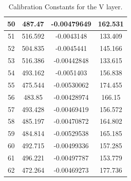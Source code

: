 \begin{table}[h]
{\begin{tabular}{|c|c|c|c|}
50   &   487.47   &   -0.00479649   &   162.531  \\  \hline  
51   &   516.592   &   -0.0043148   &   133.409  \\  \hline  
52   &   504.835   &   -0.0045441   &   145.166  \\  \hline  
53   &   516.386   &   -0.00442848   &   133.615  \\  \hline  
54   &   493.162   &   -0.0051403   &   156.838  \\  \hline  
55   &   475.544   &   -0.00530062   &   174.455  \\  \hline  
56   &   483.85   &   -0.00428974   &   166.15  \\  \hline  
57   &   493.428   &   -0.00469419   &   156.572  \\  \hline  
58   &   485.197   &   -0.00470872   &   164.802  \\  \hline  
59   &   484.814   &   -0.00529538   &   165.185  \\  \hline  
60   &   492.715   &   -0.00499336   &   157.285  \\  \hline  
61   &   496.221   &   -0.00497787   &   153.779  \\  \hline  
62   &   472.264   &   -0.00469273   &   177.736  \\  \hline    
        \end{tabular}
        }
        \caption{Calibration Constants for the V layer.}
        \label{tab:VattenC}
\end{table}


